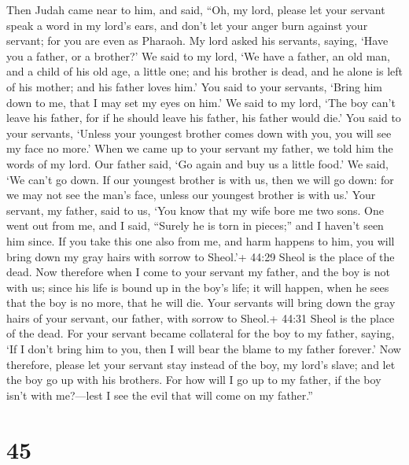  Then Judah came near to him, and said, ``Oh, my lord,
please let your servant speak a word in my lord's ears, and don't let
your anger burn against your servant; for you are even as Pharaoh.
 My lord asked his servants, saying, `Have you a father, or
a brother?'  We said to my lord, `We have a father, an old
man, and a child of his old age, a little one; and his brother is dead,
and he alone is left of his mother; and his father loves him.'
 You said to your servants, `Bring him down to me, that I
may set my eyes on him.'  We said to my lord, `The boy
can't leave his father, for if he should leave his father, his father
would die.'  You said to your servants, `Unless your
youngest brother comes down with you, you will see my face no more.'
 When we came up to your servant my father, we told him the
words of my lord.  Our father said, `Go again and buy us a
little food.'  We said, `We can't go down. If our youngest
brother is with us, then we will go down: for we may not see the man's
face, unless our youngest brother is with us.'  Your
servant, my father, said to us, `You know that my wife bore me two sons.
 One went out from me, and I said, ``Surely he is torn in
pieces;'' and I haven't seen him since.  If you take this
one also from me, and harm happens to him, you will bring down my gray
hairs with sorrow to Sheol.'+ 44:29 Sheol is the place of the dead.
 Now therefore when I come to your servant my father, and
the boy is not with us; since his life is bound up in the boy's life;
 it will happen, when he sees that the boy is no more, that
he will die. Your servants will bring down the gray hairs of your
servant, our father, with sorrow to Sheol.+ 44:31 Sheol is the place of
the dead.  For your servant became collateral for the boy
to my father, saying, `If I don't bring him to you, then I will bear the
blame to my father forever.'  Now therefore, please let
your servant stay instead of the boy, my lord's slave; and let the boy
go up with his brothers.  For how will I go up to my
father, if the boy isn't with me?---lest I see the evil that will come
on my father.''

\hypertarget{section-44}{%
\section{45}\label{section-44}}

